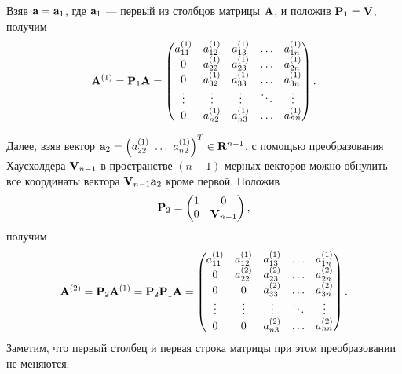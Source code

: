 \documentclass[12pt]{article}
\begin{document}
    Взяв $\bold{a}=\bold{a}_1$, где $\bold{a}_1$ --- первый из столбцов матрицы $\bold{A}$, и положив $\bold{P}_1=\bold{V}$, получим
    \begin{equation}
    	\begin{gathered}
    		\bold{A}^{\left(1\right)}=\bold{P}_{1}\bold{A}=
    		\begin{pmatrix}
    			a_{11}^{\left(1\right)} & a_{12}^{\left(1\right)} & a_{13}^{\left(1\right)} & \ldots & a_{1n}^{\left(1\right)} \\
    			0 & a_{22}^{\left(1\right)} & a_{23}^{\left(1\right)} & \ldots & a_{2n}^{\left(1\right)} \\
    			0 &  a_{32}^{\left(1\right)} & a_{33}^{\left(1\right)} & \ldots & a_{3n}^{\left(1\right)} \\
    			\vdots & \vdots & \vdots & \ddots & \vdots \\
    			0 & a_{n2}^{\left(1\right)} & a_{n3}^{\left(1\right)} & \ldots & a_{nn}^{\left(1\right)}
    		\end{pmatrix}.
    	\end{gathered}
    \end{equation}
    
    Далее, взяв вектор $\bold{a}_2=\left(a_{22}^{\left(1\right)}\,\, \ldots \,\, a_{n2}^{\left(1\right)}\right)^{T}\in \bold{R}^{n-1}$, с помощью преобразования Хаусхолдера $\bold{V}_{n-1}$ в пространстве $\left(n-1\right)$-мерных векторов можно обнулить все координаты вектора $\bold{V}_{n-1}\bold{a}_2$ кроме первой. Положив
    \begin{equation}
    	\bold{P}_2=\begin{pmatrix}
    		1 & 0 \\
    		0 & \bold{V}_{n-1}
    	\end{pmatrix},
    \end{equation}
    получим
    \begin{equation}
    	\begin{gathered}
    		\bold{A}^{\left(2\right)}=\bold{P}_{2}\bold{A}^{\left(1\right)}=\bold{P}_2\bold{P}_1\bold{A}=
    		\begin{pmatrix}
    			a_{11}^{\left(1\right)} & a_{12}^{\left(1\right)} & a_{13}^{\left(1\right)} & \ldots & a_{1n}^{\left(1\right)} \\
    			0 & a_{22}^{\left(2\right)} & a_{23}^{\left(2\right)} & \ldots & a_{2n}^{\left(2\right)} \\
    			0 & 0 & a_{33}^{\left(2\right)} & \ldots & a_{3n}^{\left(2\right)} \\
    			\vdots & \vdots & \vdots & \ddots & \vdots \\
    			0 & 0 & a_{n3}^{\left(2\right)} & \ldots & a_{nn}^{\left(2\right)}
    		\end{pmatrix}.
    	\end{gathered}
    \end{equation}
    Заметим, что первый столбец и первая строка матрицы при этом преобразовании не меняются.
    
\end{document}
